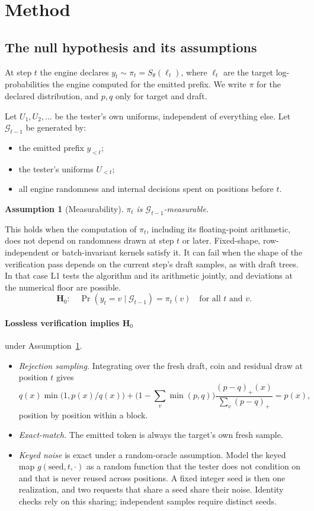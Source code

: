 \documentclass[10pt]{article}
\newtheorem{assumption}{Assumption}
\theoremstyle{remark}
\begin{document}
\section{Method}\label{sec:method}
\subsection{The null hypothesis and its assumptions}
At step $t$ the engine declares $y_t\sim\pi_t=S_\theta(\ell_t)$, where $\ell_t$ are the target log-probabilities the engine computed for the emitted prefix. We write $\pi$ for the declared distribution, and $p,q$ only for target and draft.

Let $U_1,U_2,\dots$ be the tester's own uniforms, independent of everything else. Let $\mathcal G_{t-1}$ be generated by:
\begin{itemize}
\item the emitted prefix $y_{<t}$;
\item the tester's uniforms $U_{<t}$;
\item all engine randomness and internal decisions spent on positions before $t$.
\end{itemize}

\begin{assumption}[Measurability]\label{ass:meas}
$\pi_t$ is $\mathcal G_{t-1}$-measurable.
\end{assumption}
\noindent This holds when the computation of $\pi_t$, including its floating-point arithmetic, does not depend on randomness drawn at step $t$ or later. Fixed-shape, row-independent or batch-invariant kernels satisfy it. It can fail when the shape of the verification pass depends on the current step's draft samples, as with draft trees. In that case L1 tests the algorithm and its arithmetic jointly, and deviations at the numerical floor are possible.
\[
\textbf{H}_0:\quad \Pr(y_t=v\mid\mathcal G_{t-1})=\pi_t(v)\quad\text{for all } t \text{ and } v.
\]

\paragraph{Lossless verification implies H$_0$} under Assumption~\ref{ass:meas}.
\begin{itemize}
\item \emph{Rejection sampling.} Integrating over the fresh draft, coin and residual draw at position $t$ gives
\[
q(x)\min\!\big(1,p(x)/q(x)\big)+\Big(1-\sum_v\min(p,q)\Big)\frac{(p-q)_+(x)}{\sum_v(p-q)_+}=p(x),
\]
position by position within a block.
\item \emph{Exact-match.} The emitted token is always the target's own fresh sample.
\item \emph{Keyed noise} is exact under a random-oracle assumption. Model the keyed map $g(\text{seed},t,\cdot)$ as a random function that the tester does not condition on and that is never reused across positions. A fixed integer seed is then one realization, and two requests that share a seed share their noise. Identity checks rely on this sharing; independent samples require distinct seeds.
\end{itemize}
\end{document}
